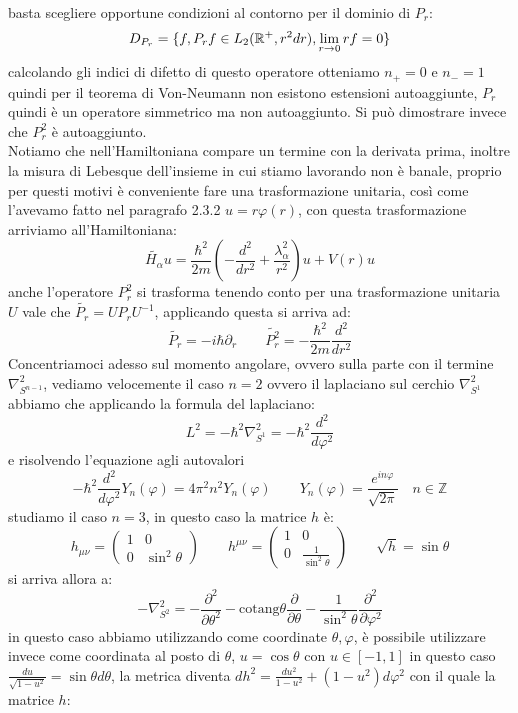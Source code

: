 basta scegliere opportune condizioni al contorno per il dominio di $P_r$:
\[D_{P_r} = \{f,P_rf\in L_2(\mathbb{R}^+,r^{2}dr), \lim_{r\to0}rf=0\}\]
calcolando gli indici di difetto di questo operatore otteniamo $n_+=0$ e $n_-=1$ quindi per il teorema di Von-Neumann non esistono estensioni autoaggiunte, $P_r$ quindi è un operatore simmetrico ma non autoaggiunto. Si può dimostrare invece che $P_r^2$ è autoaggiunto.\\
Notiamo che nell'Hamiltoniana compare un termine con la derivata prima, inoltre la misura di Lebesque dell'insieme in cui stiamo lavorando non è banale, proprio per questi motivi è conveniente fare una trasformazione unitaria, così come l'avevamo fatto nel paragrafo 2.3.2 $u = r\varphi(r)$, con questa trasformazione arriviamo all'Hamiltoniana:
\[\widetilde{H_\alpha}u = \frac{\hbar^2}{2m}\left(-\frac{d^2}{dr^2} + \frac{\lambda_\alpha^2}{r^2}\right)u + V(r)u\]
anche l'operatore $P_r^2$ si trasforma tenendo conto per una trasformazione unitaria $U$ vale che $\widetilde{P_r} = UP_rU^{-1}$, applicando questa si arriva ad:
\[\widetilde{P_r} = -i\hbar\partial_r \qquad  \widetilde{P_r^2} = -\frac{\hbar^2}{2m}\frac{d^2}{dr^2} \] 
Concentriamoci adesso sul momento angolare, ovvero sulla parte con il termine $\nabla_{S^{n-1}}^2$, vediamo velocemente il caso $n=2$ ovvero il laplaciano sul cerchio $\nabla_{S^1}^2$ abbiamo che applicando la formula del laplaciano:
\[L^2 = -\hbar^2\nabla_{S^1}^2 = -\hbar^2\frac{d^2}{d\varphi^2}\]
e risolvendo l'equazione agli autovalori 
\[-\hbar^2 \frac{d^2}{d\varphi^2} Y_n(\varphi) = 4\pi^2n^2Y_n(\varphi) \qquad Y_n(\varphi) = \frac{e^{in\varphi}}{\sqrt{2\pi}} \quad n\in\mathbb{Z}\]
studiamo il caso $n=3$, in questo caso la matrice $h$ è:
\[h_{\mu\nu} = \begin{pmatrix}
1 & 0\\
0 & \sin^2\theta
\end{pmatrix} \qquad h^{\mu\nu} = \begin{pmatrix}
1 & 0\\
0 & \frac{1}{\sin^2\theta}
\end{pmatrix}\qquad \sqrt{h} = \sin\theta\]
si arriva allora a:
\[-\nabla_{S^2}^2 = -\frac{\partial^2}{\partial\theta^2} - \text{cotang}\theta\frac{\partial}{\partial\theta} - \frac{1}{\sin^2\theta}\frac{\partial^2}{\partial\varphi^2}\]
in questo caso abbiamo utilizzando come coordinate $\theta,\varphi$, è possibile utilizzare invece come coordinata al posto di $\theta$, $u = \cos\theta$ con $u\in[-1,1]$ in questo caso $\frac{du}{\sqrt{1-u^2}} = \sin\theta d\theta$, la metrica diventa $dh^2 =\frac{du^2}{1-u^2} + (1-u^2)d\varphi^2$ con il quale la matrice $h$:
